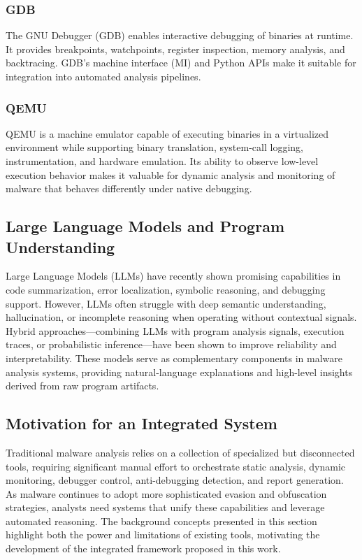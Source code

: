 \documentclass[conference]{IEEEtran}
\begin{document}
\subsubsection{GDB}
The GNU Debugger (GDB) enables interactive debugging of binaries at runtime. It provides breakpoints, watchpoints, register inspection, memory analysis, and backtracing. GDB's machine interface (MI) and Python APIs make it suitable for integration into automated analysis pipelines.

\subsubsection{QEMU}
QEMU is a machine emulator capable of executing binaries in a virtualized environment while supporting binary translation, system-call logging, instrumentation, and hardware emulation. Its ability to observe low-level execution behavior makes it valuable for dynamic analysis and monitoring of malware that behaves differently under native debugging.

\subsection{Large Language Models and Program Understanding}

Large Language Models (LLMs) have recently shown promising capabilities in code summarization, error localization, symbolic reasoning, and debugging support. However, LLMs often struggle with deep semantic understanding, hallucination, or incomplete reasoning when operating without contextual signals. Hybrid approaches—combining LLMs with program analysis signals, execution traces, or probabilistic inference—have been shown to improve reliability and interpretability. These models serve as complementary components in malware analysis systems, providing natural-language explanations and high-level insights derived from raw program artifacts.

\subsection{Motivation for an Integrated System}

Traditional malware analysis relies on a collection of specialized but disconnected tools, requiring significant manual effort to orchestrate static analysis, dynamic monitoring, debugger control, anti-debugging detection, and report generation. As malware continues to adopt more sophisticated evasion and obfuscation strategies, analysts need systems that unify these capabilities and leverage automated reasoning. The background concepts presented in this section highlight both the power and limitations of existing tools, motivating the development of the integrated framework proposed in this work.
\end{document}

